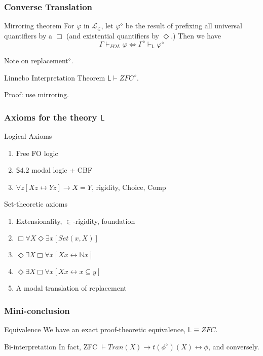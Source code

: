 \documentclass{beamer}
\begin{document}
\begin{frame}
    \frametitle{Converse Translation}
\begin{block}{Mirroring theorem}
 For $\varphi$ in $\mathcal{L}_\in$, let $\varphi^\diamond$ be the result of 
prefixing all universal quantifiers by a $\Box$ 
(and existential quantifiers by $\Diamond$.) Then we have 
\[
    \Gamma \vdash_{FOL} \varphi 
    \Leftrightarrow 
    \Gamma^\diamond \vdash_{\mathsf{L}} \varphi^\diamond
\]
\end{block}
 Note on replacement$^\diamond$.
\begin{block}{Linnebo Interpretation Theorem}
  $\mathsf{L} \vdash ZFC^\diamond$.  
\end{block}
 Proof: use mirroring.
\end{frame}
\begin{frame}
    \frametitle{Axioms for the theory $\mathsf{L}$}
    \begin{block}{Logical Axioms}
    \begin{enumerate}
        \item Free FO logic
        \item $\mathsf{S4.2}$ modal logic + CBF
        \item $\forall z[Xz \leftrightarrow Yz] \rightarrow X = Y$, rigidity,
        Choice, Comp
    \end{enumerate}
    \end{block}
    \begin{block}{Set-theoretic axioms}
        \begin{enumerate}
        \item Extensionality, $\in$-rigidity, foundation
        \item $\Box \forall X \Diamond \exists x [Set(x, X)]$
        \item $\Diamond \exists X \Box \forall x[Xx \leftrightarrow \mathbb{N}x]$
        \item $\Diamond \exists X \Box \forall x[Xx \leftrightarrow x \subseteq y]$
        \item A modal translation of replacement
        \end{enumerate}
    \end{block}
\end{frame}

\begin{frame}
    \frametitle{Mini-conclusion}
\begin{block}{Equivalence}
    We have an exact proof-theoretic equivalence, $\mathsf{L} \equiv ZFC$.
\end{block}
\begin{block}{Bi-interpretation}
    In fact, ZFC $\vdash Tran(X) \rightarrow t(\phi^\diamond)(X) \leftrightarrow \phi$, and conversely.
\end{block}
\end{frame}
\end{document}

